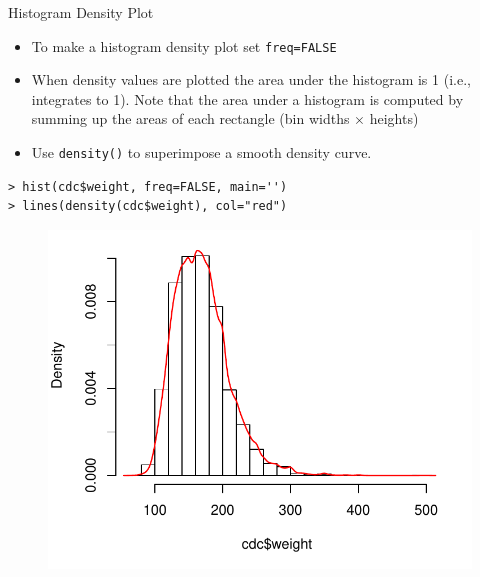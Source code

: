 \documentclass[10pt]{beamer}
\begin{document}
\begin{frame}[fragile]{Histogram Density Plot}
\small
\begin{itemize}
\item To make a histogram density plot set \texttt{freq=FALSE}
\item When density values are plotted the area under the histogram is 1 (i.e., integrates to 1).  Note that the area under a histogram is computed by summing up the areas of each rectangle (bin widths $\times$ heights)
\item Use \texttt{density()} to superimpose a smooth density curve.
\end{itemize}
\begin{verbatim}
> hist(cdc$weight, freq=FALSE, main='')
> lines(density(cdc$weight), col="red")
\end{verbatim}
\begin{figure}[htbp]
\centering
\includegraphics[scale=0.4]{figure/histd_wt.pdf}
\end{figure}
\end{frame}
\end{document}
